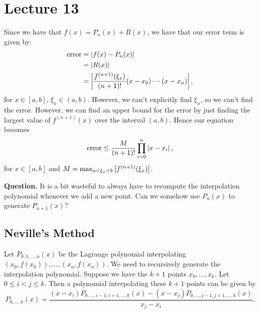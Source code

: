 \documentclass[class=article, crop=false]{standalone}
\begin{document}
  \section{Lecture 13}
  Since we have that $f(x) = P_n(x) + R(x)$, we have that our error term is given by:
  \begin{align*}
    \text{error} &= \left\lvert f(x) - P_n(x) \right\rvert \\\
                 &= \left\lvert R(x) \right\rvert \\
                 &= \left\lvert \frac{f^{(n + 1)}(\xi_x)}{(n + 1)!}(x - x_0)\dotsb(x - x_n) \right\rvert,
  \end{align*}
  for $x\in [a, b]$, $\xi_x\in (a, b)$. However, we can't explicitly find $\xi_x$, so we can't find the error. However, we can find an upper bound for the error by just finding the largest value of $f^{(n + 1)}(x)$ over the interval $(a, b)$. Hence our equation becomes
  \[
    \text{error} \leq \frac{M}{(n + 1)!}\prod_{i = 0}^n \left\lvert x - x_i \right\rvert,
  \]
  for $x\in [a, b]$ and $M = \max_{a < \xi_x < b}\left\lvert f^{(n + 1)}(\xi_x) \right\rvert$. \par
  \textbf{Question.} It is a bit wasteful to always have to recompute the interpolation polynomial whenever we add a new point. Can we somehow use $P_n(x)$ to generate $P_{n + 1}(x)$?
  \subsection{Neville's Method}
  Let $P_{0,1,\dotsc,n}(x)$ be the Lagrange polynomial interpolating $(x_0, f(x_0)),\dotsc,(x_n, f(x_n))$. We need to recursively generate the interpolation polynomial. Suppose we have the $k + 1$ points $x_0,\dotsc,x_k$. Let $0 \leq i < j \leq k$. Then a polynomial interpolating these $k + 1$ points can be given by
  \[
    P_{0,\dotsc,k}(x) = \frac{(x - x_i)P_{0,\dotsc,i - 1,i + 1,\dotsc,k}(x) - (x - x_j)P_{0,\dotsc,j - 1,j + 1,\dotsc,k}(x)}{x_j - x_i}.
  \]
\end{document}
